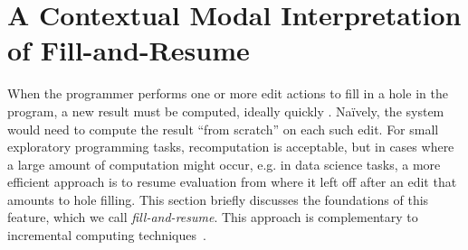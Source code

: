 




\newcommand{\commutativitySec}{A Contextual Modal Interpretation of Fill-and-Resume}
\section{\protect\commutativitySec}
\label{sec:resumption}


When the programmer performs one or more edit actions to fill in a hole in the program, a new result must be computed, ideally quickly \cite{DBLP:conf/icse/Tanimoto13,DBLP:journals/vlc/Tanimoto90}. Na\"ively, the system would need to compute the result ``from scratch'' on each such edit. For small exploratory programming tasks, recomputation is acceptable, but in cases where a large amount of computation might occur, e.g. in data science tasks, a more efficient approach is to resume evaluation from where it left off after an edit that amounts to hole filling. This section briefly discusses the foundations of this feature, which we call \emph{fill-and-resume}. This approach is complementary to incremental computing techniques~\cite{Hammer2014}.

